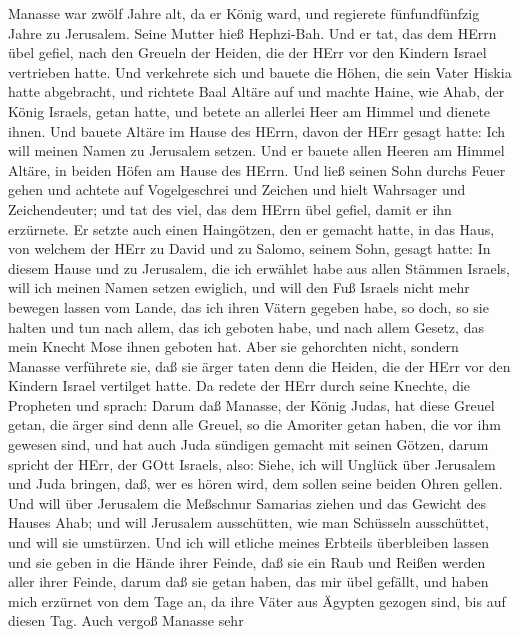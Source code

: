  Manasse war zwölf Jahre alt, da er König ward, und
regierete fünfundfünfzig Jahre zu Jerusalem. Seine Mutter hieß
Hephzi-Bah.  Und er tat, das dem HErrn übel gefiel, nach den
Greueln der Heiden, die der HErr vor den Kindern Israel vertrieben
hatte.  Und verkehrete sich und bauete die Höhen, die sein
Vater Hiskia hatte abgebracht, und richtete Baal Altäre auf und machte
Haine, wie Ahab, der König Israels, getan hatte, und betete an allerlei
Heer am Himmel und dienete ihnen.  Und bauete Altäre im
Hause des HErrn, davon der HErr gesagt hatte: Ich will meinen Namen zu
Jerusalem setzen.  Und er bauete allen Heeren am Himmel
Altäre, in beiden Höfen am Hause des HErrn.  Und ließ seinen
Sohn durchs Feuer gehen und achtete auf Vogelgeschrei und Zeichen und
hielt Wahrsager und Zeichendeuter; und tat des viel, das dem HErrn übel
gefiel, damit er ihn erzürnete.  Er setzte auch einen
Haingötzen, den er gemacht hatte, in das Haus, von welchem der HErr zu
David und zu Salomo, seinem Sohn, gesagt hatte: In diesem Hause und zu
Jerusalem, die ich erwählet habe aus allen Stämmen Israels, will ich
meinen Namen setzen ewiglich,  und will den Fuß Israels
nicht mehr bewegen lassen vom Lande, das ich ihren Vätern gegeben habe,
so doch, so sie halten und tun nach allem, das ich geboten habe, und
nach allem Gesetz, das mein Knecht Mose ihnen geboten hat. 
Aber sie gehorchten nicht, sondern Manasse verführete sie, daß sie ärger
taten denn die Heiden, die der HErr vor den Kindern Israel vertilget
hatte.  Da redete der HErr durch seine Knechte, die
Propheten und sprach:  Darum daß Manasse, der König Judas,
hat diese Greuel getan, die ärger sind denn alle Greuel, so die Amoriter
getan haben, die vor ihm gewesen sind, und hat auch Juda sündigen
gemacht mit seinen Götzen,  darum spricht der HErr, der
GOtt Israels, also: Siehe, ich will Unglück über Jerusalem und Juda
bringen, daß, wer es hören wird, dem sollen seine beiden Ohren gellen.
 Und will über Jerusalem die Meßschnur Samarias ziehen und
das Gewicht des Hauses Ahab; und will Jerusalem ausschütten, wie man
Schüsseln ausschüttet, und will sie umstürzen.  Und ich
will etliche meines Erbteils überbleiben lassen und sie geben in die
Hände ihrer Feinde, daß sie ein Raub und Reißen werden aller ihrer
Feinde,  darum daß sie getan haben, das mir übel gefällt,
und haben mich erzürnet von dem Tage an, da ihre Väter aus Ägypten
gezogen sind, bis auf diesen Tag.  Auch vergoß Manasse sehr

